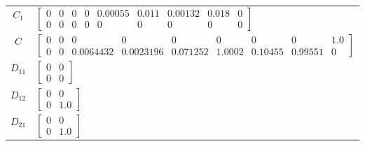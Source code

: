 \begin{tabular}{cl}
 $C_{1}$  & $\left[\begin{matrix}0 & 0 & 0 & 0 & 0.00055 & 0.011 & 0.00132 & 0.018 & 0\\0 & 0 & 0 & 0 & 0 & 0 & 0 & 0 & 0\end{matrix}\right]$                                                                                                                                                                                                                                                                                   \\
   $C$    & $\left[\begin{matrix}0 & 0 & 0 & 0 & 0 & 0 & 0 & 0 & 1.0\\0 & 0 & 0.0064432 & 0.0023196 & 0.071252 & 1.0002 & 0.10455 & 0.99551 & 0\end{matrix}\right]$                                                                                                                                                                                                                                                             \\
 $D_{11}$ & $\left[\begin{matrix}0 & 0\\0 & 0\end{matrix}\right]$                                                                                                                                                                                                                                                                                                                                                               \\
 $D_{12}$ & $\left[\begin{matrix}0 & 0\\0 & 1.0\end{matrix}\right]$                                                                                                                                                                                                                                                                                                                                                             \\
 $D_{21}$ & $\left[\begin{matrix}0 & 0\\0 & 1.0\end{matrix}\right]$                                                                                                                                                                                                                                                                                                                                                             \\
\hline
\end{tabular}